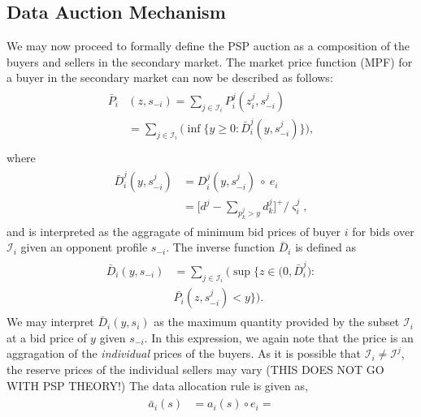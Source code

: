 \documentclass[12pt]{article}
\theoremstyle{definition}
\newcommand{\vs}{\varsigma}
\newcommand{\mcI}{\mathcal{I}}
\begin{document}
\begin{multicols}{2}
\subsection{Data Auction Mechanism}
We may now proceed to formally define the PSP auction as a composition of the
buyers and sellers in the secondary market. 
The market price function (MPF) for a buyer in the secondary market
can now be described as follows:
\begin{align}\label{dataprice}
\begin{split}
    \bar{P}_i&(z, s_{-i}) =\displaystyle\sum_{j\in\mcI_i}P_i^j(z_i^j,
s_{-i}^j) \\
    &= \sum_{j\in\mcI_i}\bigg(\inf\bigg\lbrace y\ge 0 : 
    {\bar{D}_i^j}(y,s_{-i}^j)\bigg\rbrace \bigg),\\
\end{split}
\end{align}
where
\begin{align}
\begin{split}\label{datacomposed}
    \bar{D}_i^j(y,s_{-i}^j) &= D_i^j(y,s_{-i}^j)\ \circ\ e_i\\
    &= \bigg\lbrack d^j - \sum_{p_k^j> y} d_k^j\bigg\rbrack^+/\vs_i^j,
\end{split}
\end{align}
and is interpreted as the aggragate of minimum bid prices of buyer $i$ for bids
over $\mcI_i$ given an opponent profile $s_{-i}$.
The inverse function
$\bar{D}_i$ is defined as
\begin{align}\label{datapriceinverse}
\begin{split}
    \bar{D}_i(y, s_{-i}) &= \displaystyle\sum_{j\in\mcI_i}\bigg(\sup\bigg\lbrace z\in \big( 0,
\bar{D}_i^j \big) : \\
    &\bar{P_i}(z,s_{-i}^j) < y\bigg\rbrace\bigg).
\end{split}
\end{align}
We may interpret $\bar{D}_i(y, s_i)$ as the maximum quantity provided by the subset
$\mcI_i$ at a bid price of $y$ given $s_{-i}$. In this expression, we again note that
the price is an aggragation of the \emph{individual} prices of the buyers. As it is
possible that $\mcI_i \ne \mcI^j$, the reserve prices of the individual sellers
may vary (THIS DOES NOT GO WITH PSP THEORY!)
The data allocation rule is given as,
\begin{align}\label{dataallocation}
\begin{split}
    \bar{a}_i(s) &= a_i(s) \circ e_i =

\end{split}
\end{align}
\end{multicols}
\end{document}
